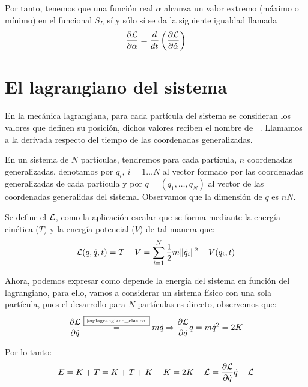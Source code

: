 Por tanto, tenemos que una función real $\alpha$ alcanza un valor extremo (máximo o mínimo) en el funcional $S_L$ sí y sólo sí se da la siguiente igualdad llamada 
\begin{equation}
	\label{eq:euler-lagrange}
	\frac{\partial \mathcal{L}}{\partial \alpha}=\frac{d}{dt}\left( \frac{\partial \mathcal{L}}{\partial \dot{\alpha}} \right)
\end{equation}

\section{El lagrangiano del sistema}\label{sec:el-lagrangiano-del-sistema}
En la mecánica lagrangiana, para cada partícula del sistema se consideran los valores que definen su posición, dichos valores reciben el nombre de ~\cite{GTP}.
Llamamos  a la derivada respecto del tiempo de las coordenadas generalizadas.

En un sistema de $N$ partículas, tendremos para cada partícula, $n$ coordenadas generalizadas, denotamos por $q_i,\ i=1\dots N$ al vector formado por las coordenadas generalizadas de cada partícula y por $q=(q_1,\dots,q_N)$ al vector de las coordenadas generalidas del sistema.
Observamos que la dimensión de $q$ es $nN$.

Se define el  $\mathcal{L}$, como la aplicación escalar que se forma mediante la energía cinética ($T$) y la energía potencial ($V$) de tal manera que:
\begin{equation}
	\label{eq:lagrangiano_clasico}
	\mathcal{L}(q,\dot{q},t)=T-V=\sum\limits_{i=1}^{N} \frac{1}{2}m\|\dot{q_i}\|^2-V(q_i,t)
\end{equation}

Ahora, podemos expresar como depende la energía del sistema en función del lagrangiano, para ello, vamos a considerar un sistema físico con una sola partícula, pues el desarrollo para $N$ partículas es directo, observemos que:
\begin{equation*}
	\frac{\partial\mathcal{L}}{\partial\dot{q}}\overset{\fbox{\tiny \ref{eq:lagrangiano_clasico}}}{=}m\dot{q}\Rightarrow \frac{\partial\mathcal{L}}{\partial\dot{q}}\dot{q} =m\dot{q}^2 = 2K
\end{equation*}

Por lo tanto:
\begin{equation}
	\label{eq:energia-lagrangiana}
	E=K+T=K+T+K-K=2K-\mathcal{L}=\frac{\partial\mathcal{L}}{\partial\dot{q}}\dot{q}-\mathcal{L}
\end{equation}